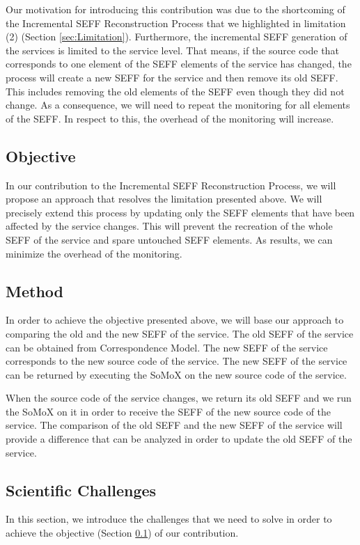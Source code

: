 Our motivation for introducing this contribution was due to the shortcoming of the Incremental SEFF Reconstruction Process that we highlighted in limitation (2) (Section \ref{sec:Limitation}). Furthermore, the incremental SEFF generation of the services is limited to the service level. That means, if the source code that corresponds to one element of the SEFF elements of the service has changed, the process will create a new SEFF for the service and then remove its old SEFF. This includes removing the old elements of the SEFF even though they did not change. As a consequence, we will need to repeat the monitoring for all elements of the SEFF. In respect to this, the overhead of the monitoring will increase.

\subsection{Objective}
\label{sec:objective}
In our contribution to the Incremental SEFF Reconstruction Process, we will propose an approach that resolves the limitation presented above. We will precisely extend this process by updating only the SEFF elements that have been affected by the service changes. This will prevent the recreation of the whole SEFF of the service and spare untouched SEFF elements. As results, we can minimize the overhead of the monitoring. 

\subsection{Method}
\label{sec:Method}
In order to achieve the objective presented above, we will base our approach to comparing the old and the new SEFF of the service. The old SEFF of the service can be obtained from Correspondence Model. The new SEFF of the service corresponds to the new source code of the service. The new SEFF of the service can be returned by executing the SoMoX on the new source code of the service. 

When the source code of the service changes, we return its old SEFF and we run the SoMoX on it in order to receive the SEFF of the new source code of the service. The comparison of the old SEFF and the new SEFF of the service will provide a difference that can be analyzed in order to update the old SEFF of the service.  

\subsection{Scientific Challenges}
\label{sec:Scientific Challenges}
In this section, we introduce the challenges that we need to solve in order to achieve the objective (Section \ref{sec:objective}) of our contribution. 

